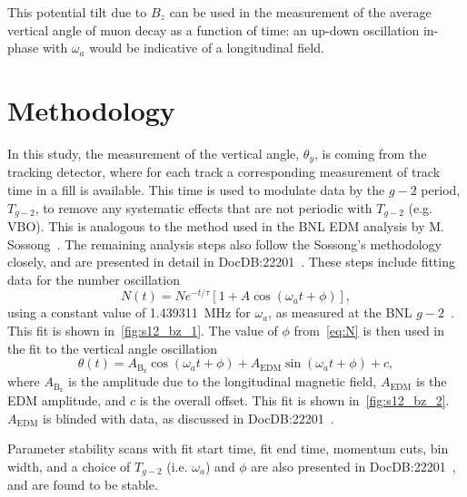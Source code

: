 \documentclass[12pt]{article}
\begin{document}
This potential tilt due to $B_z$ can be used in the measurement of the average vertical angle of muon decay as a function of time: an up-down oscillation in-phase with $\omega_a$ would be indicative of a longitudinal field.

\clearpage
\thispagestyle{plain}

\section{Methodology}
In this study, the measurement of the vertical angle, $\theta_y$, is coming from the tracking detector, where for each track a corresponding measurement of track time in a fill is available. This time is used to modulate data by the $g-2$ period, $T_{g-2}$, to remove any systematic effects that are not periodic with $T_{g-2}$ (e.g. VBO). This is analogous to the method used in the BNL EDM analysis by M. Sossong~\cite{Sossong}. The remaining analysis steps also follow the Sossong's methodology closely, and are presented in detail in DocDB:22201~\cite{Gleb_docdb}. These steps include fitting data for the number oscillation
\begin{equation}
     N(t)=Ne^{-t/\tau}[1+A\cos(\omega_at+\phi)],
     \label{eq:N}
\end{equation}
using a constant value of \SI{1.439311}{\MHz} for $\omega_a$, as measured at the BNL $g-2$~\cite{BNL_AMM}. This fit is shown in~\cref{fig:s12_bz_1}. The value of $\phi$ from~\cref{eq:N} is then used in the fit to the vertical angle oscillation
\begin{equation}
    \theta(t) =  A_{\mathrm{B_z}}\cos(\omega_a t + \phi) + A_{\mathrm{EDM}}\sin(\omega_a t + \phi) + c,
\end{equation}
where $A_{\mathrm{B_z}}$ is the amplitude due to the longitudinal magnetic field, $A_{\mathrm{EDM}}$ is the EDM amplitude, and $c$ is the overall offset. This fit is shown in~\cref{fig:s12_bz_2}. $A_{\mathrm{EDM}}$ is blinded with data, as discussed in DocDB:22201~\cite{Gleb_docdb}.

Parameter stability scans with fit start time, fit end time, momentum cuts, bin width, and a choice of $T_{g-2}$ (i.e. $\omega_a$) and $\phi$ are also presented in DocDB:22201~\cite{Gleb_docdb}, and are found to be stable.
\clearpage
\thispagestyle{plain} 
\end{document}
